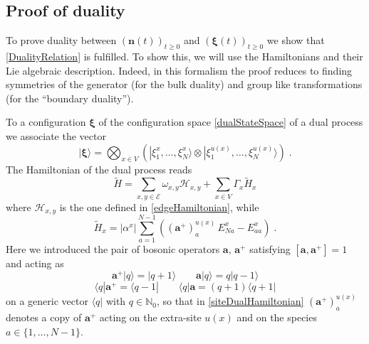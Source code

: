 \documentclass[10pt]{article}
\numberwithin{equation}{section}
\numberwithin{equation}{subsection}
\newcommand{\dt}{\;.}
\begin{document}
\subsection{Proof of duality}
To prove duality between $(\bm{n}(t))_{t\geq 0}$ and $(\bm{\xi}(t))_{t\geq 0}$ we  show that \eqref{DualityRelation} is fulfilled.  To show this, we will use the Hamiltonians and their Lie algebraic description. Indeed, in this formalism the proof 
reduces to finding symmetries of the generator (for the bulk duality) and group like transformations (for the ``boundary duality'').


To a configuration $\bm{\xi}$ of the configuration space  \eqref{dualStateSpace} of a dual process we associate the vector
\begin{equation}
    |\bm{\xi}\rangle=\bigotimes_{x\in V}\left(|\xi_{1}^{x},\ldots,\xi_{N}^{x}\rangle\otimes |\xi_{1}^{u(x)},\ldots,\xi_{N}^{u(x)}\rangle\right)\dt
\end{equation}
The Hamiltonian of the dual process reads
\begin{equation}\label{DualHamiltonian}
    \widetilde{H}=\sum_{x,y\in \mathcal{E}}\omega_{x,y}\mathcal{H}_{x,y}+\sum_{x\in V}\Gamma_{x}\widetilde{H}_{x}
\end{equation}
where $\mathcal{H}_{x,y}$ is the one defined in \eqref{edgeHamiltonian}, while 
\begin{equation}\label{siteDualHamiltonian}
    \widetilde{H}_{x}=|\alpha^{x}|\sum_{a=1}^{N-1}\left((\mathbf{a}^{+})_{a}^{u(x)}\,E_{Na}^{x}-E_{aa}^{x}\right)\dt
\end{equation}
Here we introduced the pair of bosonic operators $\mathbf{a},\,\mathbf{a}^{+}$ satisfying $[\mathbf{a},\mathbf{a}^{+}]=1$ and acting as
\begin{equation}
	\mathbf{a}^{+}|q\rangle=|q+1\rangle\qquad \mathbf{a}|q\rangle=q|q-1\rangle
\end{equation}
\begin{equation}
	\langle q|\mathbf{a}^{+}=\langle q-1|\qquad \langle q|\mathbf{a}=(q+1) \langle q+1|
\end{equation}
on a generic vector $\langle q|$ with $q\in \mathbb{N}_{0}$, so that in \eqref{siteDualHamiltonian} 
$(\mathbf{a}^{+})_{a}^{u(x)}$ denotes a copy of $\mathbf{a}^{+}$ acting on the extra-site $u(x)$ and on the species $a\in\{1,\ldots,N-1\}$. \\
\end{document}
